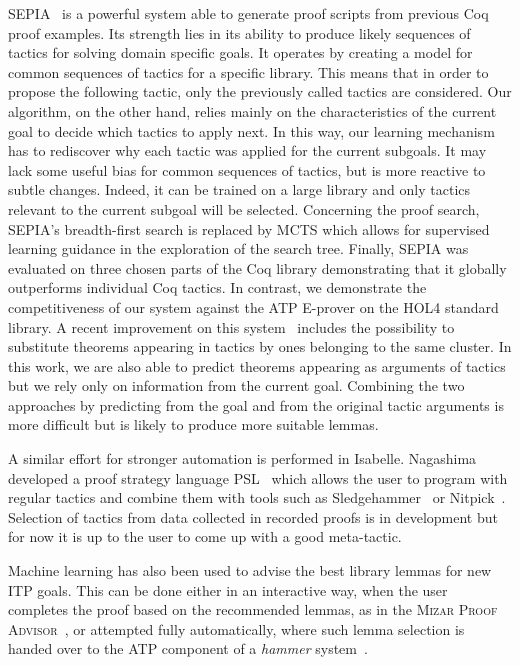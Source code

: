 \documentclass[runningheads,a4paper,draft]{svjour3}
\def\holfour{\textsf{HOL4}\xspace}
\def\isabelle{\textsf{Isabelle}\xspace}
\def\coq{\textsf{Coq}\xspace}
\def\eprover{\textsf{E-prover}\xspace}
\def\sledgehammer{\textsf{Sledgehammer}\xspace}
\begin{document}
\textsf{SEPIA}~\cite{DBLP:conf/cade/GransdenWR15} is a powerful system able to 
generate
proof scripts from previous \coq proof examples.
Its strength lies in its ability to produce likely sequences 
of tactics for solving domain specific goals. It operates by creating a model 
for common sequences of tactics for a specific library.
This means that in order to propose the following tactic, only the previously 
called tactics
are considered.
Our algorithm, on the other hand, relies mainly on the characteristics of the 
current goal 
to decide
which tactics to apply next. In this way, our learning mechanism has to 
rediscover why each 
tactic was applied for the current subgoals. It may lack some useful bias for 
common sequences 
of tactics, but is more reactive to subtle changes. Indeed, it can be trained 
on a large library and only tactics relevant to the current subgoal will be 
selected. 
Concerning the proof search, \textsf{SEPIA}'s %
breadth-first search is replaced by MCTS which allows for supervised learning
guidance in the exploration of the search tree.
Finally, \textsf{SEPIA} was evaluated on three chosen parts of the 
\coq library demonstrating that it globally outperforms individual \coq 
tactics. In contrast, we demonstrate the competitiveness of our system against 
the ATP \eprover on the \holfour standard library.
A recent improvement on this system~\cite{} includes the 
possibility to 
substitute theorems appearing in tactics by ones belonging to the same cluster. 
In this work, we are also able to predict theorems appearing as arguments of 
tactics but we rely only on information from the current goal. Combining the 
two approaches by predicting from the goal and from the original tactic 
arguments is more difficult but is likely to produce more suitable lemmas.

A similar effort for stronger automation is performed in \isabelle. Nagashima 
developed a proof strategy language PSL~\cite{NagashimaK17psl} which allows the 
user to 
program with regular tactics and combine them with tools such as 
\sledgehammer~\cite{sledgehammer10} or Nitpick~\cite{Nitpick10}. 
Selection of tactics from data collected in recorded proofs is in development 
but for now it is up to the user to come up with a good meta-tactic.


Machine learning has also been used to advise the best library lemmas for new 
ITP goals.
This can be done either in an interactive way, when the user completes the 
proof based on the recommended lemmas, as in the \textsc{Mizar Proof 
Advisor}~\cite{Urb04-MPTP0}, or attempted fully automatically, where such lemma 
selection is handed over to the ATP component of a \emph{hammer} 
system~\cite{hammers4qed,tgck-cpp15,holyhammer,BlanchetteGKKU16,mizAR40}.
\end{document}

